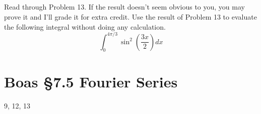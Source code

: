\documentclass[12pt]{article}
\begin{document}
\subsection{}
Read through Problem 13. If the result doesn't seem obvious to you,
you may prove it and I'll grade it for extra credit. Use the result of
Problem 13 to evaluate the following integral without doing any calculation.
\begin{equation}
  \int_0^{4\pi/3}\sin^2\left(\frac{3x}{2}\right) dx
\end{equation}

\section{Boas \S7.5 Fourier Series}

9, 12, 13
\end{document}
